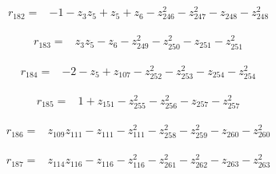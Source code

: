 \par\noindent\begin{minipage}{\linewidth}
\begin{align*}
r_{182}={}&-1-z_{3}z_{5}+z_{5}+z_{6}-z_{246}^{2}-z_{247}^{2}-z_{248}-z_{248}^{2}
\end{align*}
\end{minipage}\par
\par\noindent\begin{minipage}{\linewidth}
\begin{align*}
r_{183}={}&z_{3}z_{5}-z_{6}-z_{249}^{2}-z_{250}^{2}-z_{251}-z_{251}^{2}
\end{align*}
\end{minipage}\par
\par\noindent\begin{minipage}{\linewidth}
\begin{align*}
r_{184}={}&-2-z_{5}+z_{107}-z_{252}^{2}-z_{253}^{2}-z_{254}-z_{254}^{2}
\end{align*}
\end{minipage}\par
\par\noindent\begin{minipage}{\linewidth}
\begin{align*}
r_{185}={}&1+z_{151}-z_{255}^{2}-z_{256}^{2}-z_{257}-z_{257}^{2}
\end{align*}
\end{minipage}\par
\par\noindent\begin{minipage}{\linewidth}
\begin{align*}
r_{186}={}&z_{109}z_{111}-z_{111}-z_{111}^{2}-z_{258}^{2}-z_{259}^{2}-z_{260}-z_{260}^{2}
\end{align*}
\end{minipage}\par
\par\noindent\begin{minipage}{\linewidth}
\begin{align*}
r_{187}={}&z_{114}z_{116}-z_{116}-z_{116}^{2}-z_{261}^{2}-z_{262}^{2}-z_{263}-z_{263}^{2}
\end{align*}
\end{minipage}\par
